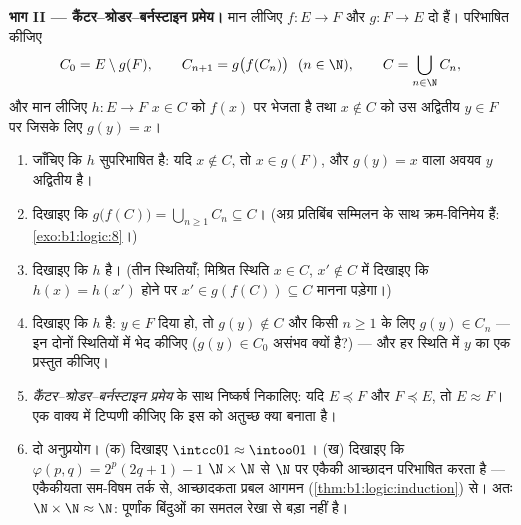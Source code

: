 \begin{problem}
\medskip \noindent\textbf{भाग II --- कैंटर--श्रोडर--बर्नस्टाइन प्रमेय।} मान
लीजिए $f \colon E \to F$ और $g \colon F \to E$ दो   हैं।
परिभाषित कीजिए
\[
C_0 = E \setminus g(F), \qquad C_{n+1} = g\bigl(f(C_n)\bigr)
\ \ (n \in \N), \qquad C = \bigcup_{n \in \N} C_n,
\]
और मान लीजिए $h \colon E \to F$ $x \in C$ को $f(x)$ पर भेजता है तथा $x
\notin C$ को उस अद्वितीय $y \in F$ पर जिसके लिए $g(y) = x$।
\begin{enumerate}[resume]
  \item जाँचिए कि $h$ सुपरिभाषित है: यदि $x \notin C$, तो $x \in g(F)$, और
  $g(y) = x$ वाला अवयव $y$ अद्वितीय है।
  \item दिखाइए कि $g\bigl(f(C)\bigr) = \bigcup_{n \geq 1} C_n \subseteq C$।
  (अग्र प्रतिबिंब सम्मिलन के साथ क्रम-विनिमेय हैं: \cref{exo:b1:logic:8}।)
  \item दिखाइए कि $h$  है। (तीन स्थितियाँ; मिश्रित स्थिति $x \in C$,
  $x' \notin C$ में दिखाइए कि $h(x) = h(x')$ होने पर $x' \in g(f(C))
  \subseteq C$ मानना पड़ेगा।)
  \item दिखाइए कि $h$  है: $y \in F$ दिया हो, तो $g(y) \notin C$ और
  किसी $n \geq 1$ के लिए $g(y) \in C_n$ --- इन दोनों स्थितियों में भेद कीजिए
  ($g(y) \in C_0$ असंभव क्यों है?) --- और हर स्थिति में $y$ का एक
   प्रस्तुत कीजिए।
  \item \emph{कैंटर--श्रोडर--बर्नस्टाइन प्रमेय} के साथ निष्कर्ष निकालिए: यदि
  $E \preceq F$ और $F \preceq E$, तो $E \approx F$। एक वाक्य में टिप्पणी
  कीजिए कि इस  को अतुच्छ क्या बनाता है।
  \item दो अनुप्रयोग। (क) दिखाइए $\intcc01 \approx \intoo01$। (ख) दिखाइए कि
  $\varphi(p, q) = 2^p(2q + 1) - 1$ $\N \times \N$ से $\N$ पर एकैकी आच्छादन
  परिभाषित करता है --- एकैकीयता सम-विषम तर्क से, आच्छादकता प्रबल आगमन
  (\cref{thm:b1:logic:induction}) से। अतः $\N \times \N \approx \N$:
  पूर्णांक बिंदुओं का समतल रेखा से बड़ा नहीं है।
\end{enumerate}


\end{problem}
